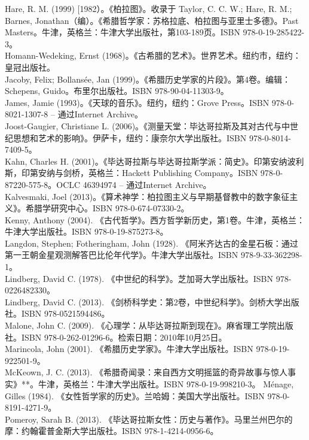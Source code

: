 Hare, R. M. (1999) [1982）。《柏拉图》。收录于 Taylor, C. C. W.; Hare, R. M.; Barnes, Jonathan（编）。《希腊哲学家：苏格拉底、柏拉图与亚里士多德》。Past Masters。牛津，英格兰：牛津大学出版社，第103-189页。ISBN 978-0-19-285422-3。\\  
Homann-Wedeking, Ernst (1968)。《古希腊的艺术》。世界艺术。纽约市，纽约：皇冠出版社。\\  
Jacoby, Felix; Bollansée, Jan (1999)。《希腊历史学家的片段》。第4卷。编辑：Schepens, Guido。布里尔出版社。ISBN 978-90-04-11303-9。\\  
James, Jamie (1993)。《天球的音乐》。纽约，纽约：Grove Press。ISBN 978-0-8021-1307-8 – 通过Internet Archive。\\  
Joost-Gaugier, Christiane L. (2006)。《测量天堂：毕达哥拉斯及其对古代与中世纪思想和艺术的影响》。伊萨卡，纽约：康奈尔大学出版社。ISBN 978-0-8014-7409-5。\\  
Kahn, Charles H. (2001)。《毕达哥拉斯与毕达哥拉斯学派：简史》。印第安纳波利斯，印第安纳与剑桥，英格兰：Hackett Publishing Company。ISBN 978-0-87220-575-8。OCLC 46394974 – 通过Internet Archive。\\  
Kalvesmaki, Joel (2013)。《算术神学：柏拉图主义与早期基督教中的数字象征主义》。希腊学研究中心。ISBN 978-0-674-07330-2。\\
Kenny, Anthony (2004). 《古代哲学》。西方哲学新历史，第1卷。牛津，英格兰：牛津大学出版社。ISBN 978-0-19-875273-8。\\  
Langdon, Stephen; Fotheringham, John (1928). 《阿米齐达古的金星石板：通过第一王朝金星观测解答巴比伦年代学》。牛津大学出版社。ISBN 978-9-33-362298-1。\\  
Lindberg, David C. (1978). 《中世纪的科学》。芝加哥大学出版社。ISBN 978-0226482330。\\  
Lindberg, David C. (2013). 《剑桥科学史：第2卷，中世纪科学》。剑桥大学出版社。ISBN 978-0521594486。\\  
Malone, John C. (2009). 《心理学：从毕达哥拉斯到现在》。麻省理工学院出版社。ISBN 978-0-262-01296-6。检索日期：2010年10月25日。\\  
Marincola, John (2001). 《希腊历史学家》。牛津大学出版社。ISBN 978-0-19-922501-9。\\  
McKeown, J. C. (2013). 《希腊奇闻录：来自西方文明摇篮的奇异故事与惊人事实》**。牛津，英格兰：牛津大学出版社。ISBN 978-0-19-998210-3。  
Ménage, Gilles (1984). 《女性哲学家的历史》。兰哈姆：美国大学出版社。ISBN 978-0-8191-4271-9。\\  
Pomeroy, Sarah B. (2013). 《毕达哥拉斯女性：历史与著作》。马里兰州巴尔的摩：约翰霍普金斯大学出版社。ISBN 978-1-4214-0956-6。\\
